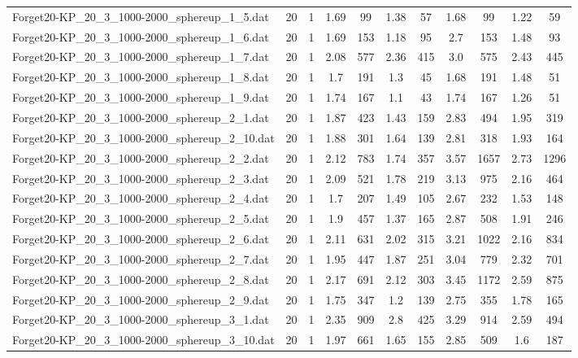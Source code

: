 \begin{table}[!ht]
\begin{tabular}{lcccccccccc}
Forget20-KP\_20\_3\_1000-2000\_sphereup\_1\_5.dat & 20 & 1 & 1.69 & 99 & 1.38 & 57 & 1.68 & 99 & 1.22 & 59 \\
Forget20-KP\_20\_3\_1000-2000\_sphereup\_1\_6.dat & 20 & 1 & 1.69 & 153 & 1.18 & 95 & 2.7 & 153 & 1.48 & 93 \\
Forget20-KP\_20\_3\_1000-2000\_sphereup\_1\_7.dat & 20 & 1 & 2.08 & 577 & 2.36 & 415 & 3.0 & 575 & 2.43 & 445 \\
Forget20-KP\_20\_3\_1000-2000\_sphereup\_1\_8.dat & 20 & 1 & 1.7 & 191 & 1.3 & 45 & 1.68 & 191 & 1.48 & 51 \\
Forget20-KP\_20\_3\_1000-2000\_sphereup\_1\_9.dat & 20 & 1 & 1.74 & 167 & 1.1 & 43 & 1.74 & 167 & 1.26 & 51 \\
Forget20-KP\_20\_3\_1000-2000\_sphereup\_2\_1.dat & 20 & 1 & 1.87 & 423 & 1.43 & 159 & 2.83 & 494 & 1.95 & 319 \\
Forget20-KP\_20\_3\_1000-2000\_sphereup\_2\_10.dat & 20 & 1 & 1.88 & 301 & 1.64 & 139 & 2.81 & 318 & 1.93 & 164 \\
Forget20-KP\_20\_3\_1000-2000\_sphereup\_2\_2.dat & 20 & 1 & 2.12 & 783 & 1.74 & 357 & 3.57 & 1657 & 2.73 & 1296 \\
Forget20-KP\_20\_3\_1000-2000\_sphereup\_2\_3.dat & 20 & 1 & 2.09 & 521 & 1.78 & 219 & 3.13 & 975 & 2.16 & 464 \\
Forget20-KP\_20\_3\_1000-2000\_sphereup\_2\_4.dat & 20 & 1 & 1.7 & 207 & 1.49 & 105 & 2.67 & 232 & 1.53 & 148 \\
Forget20-KP\_20\_3\_1000-2000\_sphereup\_2\_5.dat & 20 & 1 & 1.9 & 457 & 1.37 & 165 & 2.87 & 508 & 1.91 & 246 \\
Forget20-KP\_20\_3\_1000-2000\_sphereup\_2\_6.dat & 20 & 1 & 2.11 & 631 & 2.02 & 315 & 3.21 & 1022 & 2.16 & 834 \\
Forget20-KP\_20\_3\_1000-2000\_sphereup\_2\_7.dat & 20 & 1 & 1.95 & 447 & 1.87 & 251 & 3.04 & 779 & 2.32 & 701 \\
Forget20-KP\_20\_3\_1000-2000\_sphereup\_2\_8.dat & 20 & 1 & 2.17 & 691 & 2.12 & 303 & 3.45 & 1172 & 2.59 & 875 \\
Forget20-KP\_20\_3\_1000-2000\_sphereup\_2\_9.dat & 20 & 1 & 1.75 & 347 & 1.2 & 139 & 2.75 & 355 & 1.78 & 165 \\
Forget20-KP\_20\_3\_1000-2000\_sphereup\_3\_1.dat & 20 & 1 & 2.35 & 909 & 2.8 & 425 & 3.29 & 914 & 2.59 & 494 \\
Forget20-KP\_20\_3\_1000-2000\_sphereup\_3\_10.dat & 20 & 1 & 1.97 & 661 & 1.65 & 155 & 2.85 & 509 & 1.6 & 187 \\

\end{tabular}
\end{table}
